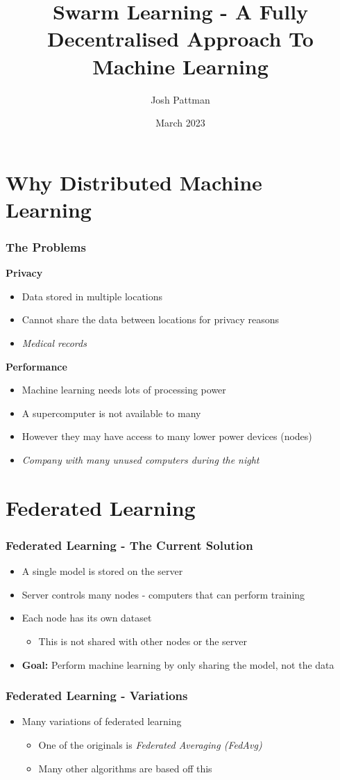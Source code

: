 \documentclass{beamer}
\title{Swarm Learning - A Fully Decentralised Approach To Machine Learning}
\author{Josh Pattman}
\institute{University Of Southampton}
\date{March 2023}
\begin{document}
	\frame{\titlepage}
	
	\section{Why Distributed Machine Learning}
	\begin{frame}
		\frametitle{The Problems}
		\textbf{Privacy}
		\begin{itemize}
			\item Data stored in multiple locations
			\item Cannot share the data between locations for privacy reasons
			\item \emph{Medical records}
		\end{itemize}
		
		\textbf{Performance}
		\begin{itemize}
			\item Machine learning needs lots of processing power
			\item A supercomputer is not available to many
			\item However they may have access to many lower power devices (nodes)
			\item \emph{Company with many unused computers during the night}
		\end{itemize}
	\end{frame}

	\section{Federated Learning}
	\begin{frame}
		\frametitle{Federated Learning - The Current Solution}
		\begin{itemize}
			\item A single model is stored on the server
			\item Server controls many nodes - computers that can perform training
			\item Each node has its own dataset
			\begin{itemize}
				\item This is not shared with other nodes or the server
			\end{itemize}
			\item \textbf{Goal:} Perform machine learning by only sharing the model, not the data
		\end{itemize}
	\end{frame}

	\begin{frame}
		\frametitle{Federated Learning - Variations}
		\begin{itemize}
			\item Many variations of federated learning
			\begin{itemize}
				\item One of the originals is \emph{Federated Averaging (FedAvg)}
				\item Many other algorithms are based off this
			\end{itemize}
		\end{itemize}
	\end{frame}
\end{document}
